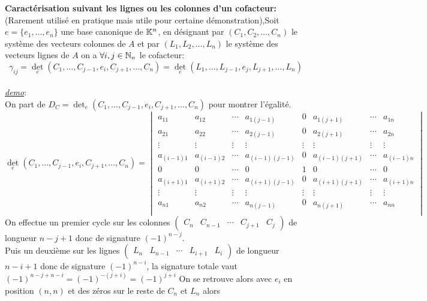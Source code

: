\textbf{Caractérisation suivant les lignes ou les colonnes d'un cofacteur:}
(Rarement utilisé en pratique mais utile pour certaine démonstration),Soit $e=\{e_1,\dots,e_n\}$ une base canonique de $\mathbb{K}^n$, en désignant par $(C_1,C_2,\dots,C_n)$ le système des vecteurs colonnes de $A$ et 
par $(L_1,L_2,\dots,L_n)$ le système des vecteurs lignes de $A$ on a $\forall i,j\in\mathbb{N}_n$ le cofacteur:\\
$$\gamma_{ij}=\det_e(C_1,\dots,C_{j-1},e_i,C_{j+1},\dots,C_n)=\det_e(L_1,\dots,L_{j-1},e_j,L_{j+1},\dots,L_n)$$\\
\underline{\textit{demo}}:\\
On part de $D_C=\det_e(C_1,\dots,C_{j-1},e_i,C_{j+1},\dots,C_n)$ pour montrer l'égalité.\\
\[\det_e(C_1,\dots,C_{j-1},e_i,C_{j+1},\dots,C_n)=\begin{vmatrix}
	a_{11} & a_{12} & \cdots &a_{1(j-1)}& 0 &a_{1(j+1)}& \cdots & a_{1n} \\
	a_{21} & a_{22} & \cdots & a_{2(j-1)}& 0 &a_{2(j+1)}& \cdots & a_{2n} \\
	\vdots & \vdots & \vdots & \vdots & \vdots & \vdots & \vdots & \vdots  \\
	a_{(i-1)1} & a_{(i-1)2} & \cdots & a_{(i-1)(j-1)}& 0 &a_{(i-1)(j+1)}& \cdots & a_{(i-1)n} \\
	0&0&\cdots&0&1&0&\cdots&0\\
	a_{(i+1)1} & a_{(i+1)2} & \cdots & a_{(i+1)(j-1)}& 0 &a_{(i+1)(j+1)}& \cdots & a_{(i+1)n} \\
	\vdots & \vdots & \vdots & \vdots & \vdots & \vdots & \vdots & \vdots  \\
	a_{n1} & a_{n2} & \cdots &a_{n(j-1)}& 0 &a_{n(j+1)}& \cdots & a_{nn} \\
\end{vmatrix}\] On effectue un premier cycle sur les colonnes $\begin{pmatrix}
C_n & C_{n-1} & \cdots & C_{j+1} & C_j
\end{pmatrix}$ de longueur $n-j+1$ donc de signature $(-1)^{n-j}$.\\
Puis un deuxième sur les lignes $\begin{pmatrix}
	L_n & L_{n-1} & \cdots & L_{i+1} & L_i
\end{pmatrix}$ de longueur $n-i+1$ donc de signature $(-1)^{n-i}$, la signature totale vaut $(-1)^{n-j+n-i}=(-1)^{-(j+i)}=(-1)^{j+i}$
On se retrouve alors avec $e_i$ en position $(n,n)$ et des zéros sur le reste de $C_n$ et $L_n$ alors 
